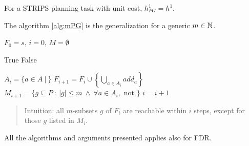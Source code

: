 \documentclass[10pt, letterpaper]{report}
\begin{document}
\begin{proposition}
    For a STRIPS planning task with unit cost, $h^1_{PG}=h^1$.
\end{proposition}

The algorithm \ref{alg:mPG} is the generalization for a generic $m\in {\mathbb N}$.

\begin{algorithm}
\caption{$m$-Planning-Graph}\label{alg:mPG}
\begin{algorithmic}[1]
\State $F_0=s$, $i=0$, $M=\emptyset$
\Statex 

    \State\Return True
    \EndIf 
    \State\Return False
\EndFunction

\Statex
{}
\State $A_i=\{a\in A \ | \ $$\}$
\State $\displaystyle F_{i+1}=F_i\cup \left\{ \bigcup_{a\in A_i}add_a \right\}$
\State $M_{i+1}=\{g\subseteq P \ : \ |g|\le m \ \land \ 
\forall a\in A_i, $ not $ \}$
\State\Return 
\EndIf
\State $i=i+1$
\EndWhile
\end{algorithmic}
\end{algorithm}

\begin{quote}
    Intuition: all $m$-subsets $g$ of $F_i$  are reachable within $i$ steps, except for those
 $g$ listed in $M_i$.
\end{quote}

\noindent All the algorithms and arguments presented applies also for FDR.
\end{document}
